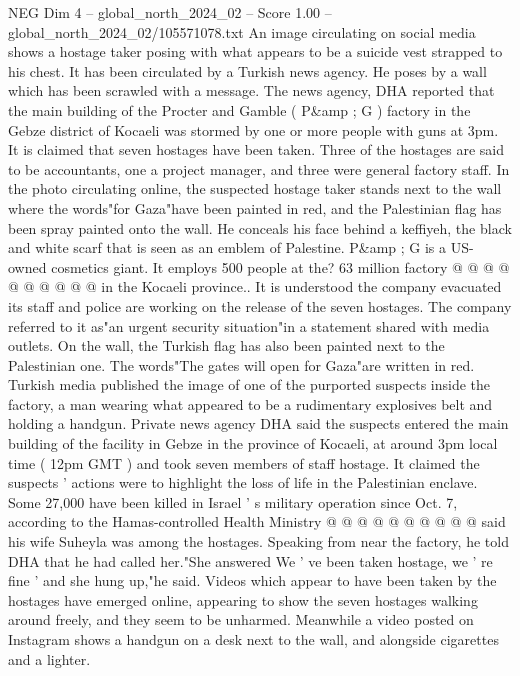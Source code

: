 \begin{textsample}{NEG Dim 4 – global\_north\_2024\_02 – Score 1.00 – global\_north\_2024\_02/105571078.txt}  \label{ex:f4_neg_284}
An image circulating on social media shows a hostage taker posing with what appears to be a suicide vest strapped to his chest.
It has been circulated by a Turkish news agency.
He poses by a wall which has been scrawled with a message.
The news agency, DHA reported that the main building of the Procter and Gamble ( P\&amp ; G ) factory in the Gebze district of Kocaeli was stormed by one or more people with guns at 3pm.
It is claimed that seven hostages have been taken.
Three of the hostages are said to be accountants, one a project manager, and three were general factory staff.
In the photo circulating online, the suspected hostage taker stands next to the wall where the words"for Gaza"have been painted in red, and the Palestinian flag has been spray painted onto the wall.
He conceals his face behind a keffiyeh, the black and white scarf that is seen as an emblem of Palestine.
P\&amp ; G is a US-owned cosmetics giant.
It employs 500 people at the? 63 million factory @ @ @ @ @ @ @ @ @ @ in the Kocaeli province..
It is understood the company evacuated its staff and police are working on the release of the seven hostages.
The company referred to it as"an urgent security situation"in a statement shared with media outlets.
On the wall, the Turkish flag has also been painted next to the Palestinian one.
The words"The gates will open for Gaza"are written in red.
Turkish media published the image of one of the purported suspects inside the factory, a man wearing what appeared to be a rudimentary explosives belt and holding a handgun.
Private news agency DHA said the suspects entered the main building of the facility in Gebze in the province of Kocaeli, at around 3pm local time ( 12pm GMT ) and took seven members of staff hostage.
It claimed the suspects ' actions were to highlight the loss of life in the Palestinian enclave.
Some 27,000 have been killed in Israel ' s military operation since Oct. 7, according to the Hamas-controlled Health Ministry @ @ @ @ @ @ @ @ @ @ said his wife Suheyla was among the hostages.
Speaking from near the factory, he told DHA that he had called her."She answered We ' ve been taken hostage, we ' re fine ' and she hung up,"he said.
Videos which appear to have been taken by the hostages have emerged online, appearing to show the seven hostages walking around freely, and they seem to be unharmed.
Meanwhile a video posted on Instagram shows a handgun on a desk next to the wall, and alongside cigarettes and a lighter.

\end{textsample}
